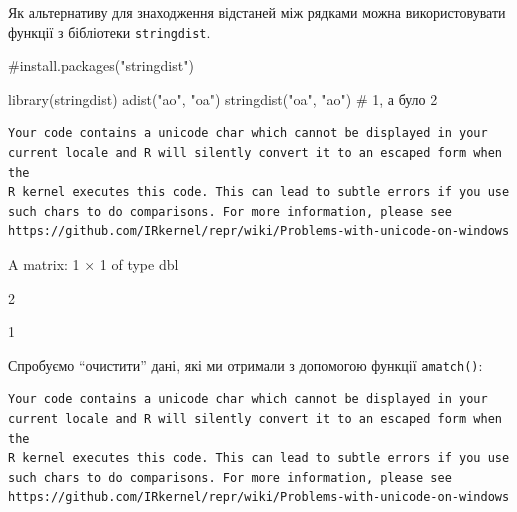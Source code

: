 \documentclass[
  letterpaper,
  DIV=11,
  numbers=noendperiod]{scrreprt}
\newenvironment{Shaded}{\begin{snugshade}}{\end{snugshade}}
\newcommand{\AttributeTok}[1]{\textcolor[rgb]{0.40,0.45,0.13}{#1}}
\newcommand{\CommentTok}[1]{\textcolor[rgb]{0.37,0.37,0.37}{#1}}
\newcommand{\DecValTok}[1]{\textcolor[rgb]{0.68,0.00,0.00}{#1}}
\newcommand{\FunctionTok}[1]{\textcolor[rgb]{0.28,0.35,0.67}{#1}}
\newcommand{\NormalTok}[1]{\textcolor[rgb]{0.00,0.23,0.31}{#1}}
\newcommand{\OtherTok}[1]{\textcolor[rgb]{0.00,0.23,0.31}{#1}}
\newcommand{\SpecialCharTok}[1]{\textcolor[rgb]{0.37,0.37,0.37}{#1}}
\newcommand{\StringTok}[1]{\textcolor[rgb]{0.13,0.47,0.30}{#1}}
\begin{document}
Як альтернативу для знаходження відстаней між рядками можна
використовувати функції з бібліотеки \texttt{stringdist}.

\begin{Shaded}
\begin{Highlighting}[]
\CommentTok{\#install.packages("stringdist")}
\end{Highlighting}
\end{Shaded}

\begin{Shaded}
\begin{Highlighting}[]
\FunctionTok{library}\NormalTok{(stringdist)}
\FunctionTok{adist}\NormalTok{(}\StringTok{"ao"}\NormalTok{, }\StringTok{"oa"}\NormalTok{)}
\FunctionTok{stringdist}\NormalTok{(}\StringTok{"oa"}\NormalTok{, }\StringTok{"ao"}\NormalTok{) }\CommentTok{\# 1, а було 2}
\end{Highlighting}
\end{Shaded}

\begin{verbatim}
Your code contains a unicode char which cannot be displayed in your
current locale and R will silently convert it to an escaped form when the
R kernel executes this code. This can lead to subtle errors if you use
such chars to do comparisons. For more information, please see
https://github.com/IRkernel/repr/wiki/Problems-with-unicode-on-windows
\end{verbatim}

A matrix: 1 × 1 of type dbl

2 \textbar{}

1

Спробуємо ``очистити'' дані, які ми отримали з допомогою функції
\texttt{amatch()}:

\begin{Shaded}
\end{Shaded}

\begin{verbatim}
Your code contains a unicode char which cannot be displayed in your
current locale and R will silently convert it to an escaped form when the
R kernel executes this code. This can lead to subtle errors if you use
such chars to do comparisons. For more information, please see
https://github.com/IRkernel/repr/wiki/Problems-with-unicode-on-windows
\end{verbatim}
\end{document}
